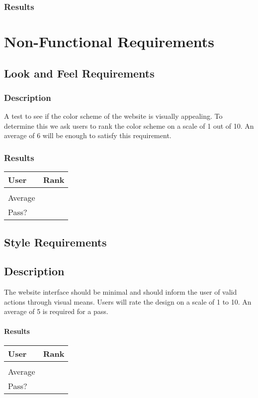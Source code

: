 \documentclass{scrreprt}
\begin{document}
\subsection{Results}

\chapter{Non-Functional Requirements}

\section{Look and Feel Requirements}
\subsection{Description}
\begin{flushleft}
A test to see if the color scheme of the website is visually appealing. To determine this we ask users to rank the color scheme on a scale of 1 out of 10. An average of 6 will be enough to satisfy this requirement.
\subsection{Results}
\end{flushleft}
 \centering
 \begin{tabular}{||p{2.5cm}|p{2.5cm}||}
 \hline
 \bf User & \bf Rank\\
 \hline\hline
 & \\
 \hline
 Average &  \\ %
 \hline
 Pass? & \\
 \hline
 \end{tabular}

\section{Style Requirements}
\section{Description}
\begin{flushleft}
The website interface should be minimal and should inform the user of valid actions through visual means. Users will rate the design on a scale of 1 to 10. An average of 5 is required for a pass.
\subsubsection{Results}
\end{flushleft}
 \centering
 \begin{tabular}{||p{2.5cm}|p{2.5cm}||}
 \hline
 \bf User & \bf Rank\\
 \hline\hline
 & \\
 \hline
 Average &  \\ %
 \hline
 Pass? & \\
 \hline
 \end{tabular}
\end{document}
